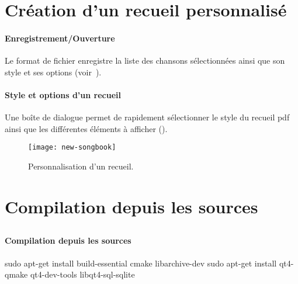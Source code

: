 \section{Création d'un recueil personnalisé}

\paragraph{Enregistrement/Ouverture}
Le format de fichier  enregistre la liste des chansons
sélectionnées ainsi que son style et ses options
(voir~).

\paragraph{Style et options d'un recueil}
Une boîte de dialogue permet de rapidement sélectionner le style du
recueil pdf ainsi que les différentes éléments à afficher
().

\begin{figure}
  \centering
  \texttt{[image: new-songbook]}
  \caption{Personnalisation d'un recueil.}
  \label{fig:new-songbook}
\end{figure}

\section{Compilation depuis les sources}

\subsection{\linux}

\paragraph{Compilation depuis les sources}

\begin{unix}
  sudo apt-get install build-essential cmake libarchive-dev
  sudo apt-get install qt4-qmake qt4-dev-tools libqt4-sql-sqlite
\end{unix}

